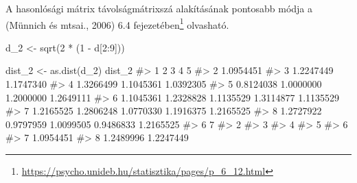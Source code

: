 \documentclass[
  letterpaper,
]{krantz}
\makeatletter
\newenvironment{Shaded}{\begin{snugshade}}{\end{snugshade}}
\newcommand{\AttributeTok}[1]{\textcolor[rgb]{0.40,0.45,0.13}{#1}}
\newcommand{\CommentTok}[1]{\textcolor[rgb]{0.37,0.37,0.37}{#1}}
\newcommand{\DecValTok}[1]{\textcolor[rgb]{0.68,0.00,0.00}{#1}}
\newcommand{\FunctionTok}[1]{\textcolor[rgb]{0.28,0.35,0.67}{#1}}
\newcommand{\NormalTok}[1]{\textcolor[rgb]{0.00,0.23,0.31}{#1}}
\newcommand{\OtherTok}[1]{\textcolor[rgb]{0.00,0.23,0.31}{#1}}
\newcommand{\SpecialCharTok}[1]{\textcolor[rgb]{0.37,0.37,0.37}{#1}}
\renewcommand{\href}[2]{#2\footnote{\url{#1}}}
\newenvironment{kframe}{%
\medskip{}
\setlength{\fboxsep}{.8em}
 \def\at@end@of@kframe{}%
 \ifinner\ifhmode%
  \def\at@end@of@kframe{\end{minipage}}%
  \begin{minipage}{\columnwidth}%
 \fi\fi%
 \def\FrameCommand##1{\hskip\@totalleftmargin \hskip-\fboxsep
 \colorbox{shadecolor}{##1}\hskip-\fboxsep
     \hskip-\linewidth \hskip-\@totalleftmargin \hskip\columnwidth}%
 \MakeFramed {\advance\hsize-\width
   \@totalleftmargin\z@ \linewidth\hsize
   \@setminipage}}%
 {\par\unskip\endMakeFramed%
 \at@end@of@kframe}
\renewenvironment{Shaded}{\begin{kframe}}{\end{kframe}}
\makeatother
\begin{document}
\begin{Shaded}
\end{Shaded}

A hasonlósági mátrix távolságmátrixszá alakításának pontosabb módja a
(Münnich és mtsai., 2006)
\href{https://psycho.unideb.hu/statisztika/pages/p_6_12.html}{6.4
fejezetében} olvasható.

\begin{Shaded}
\begin{Highlighting}[]
\NormalTok{d\_2 }\OtherTok{\textless{}{-}} \FunctionTok{sqrt}\NormalTok{(}\DecValTok{2} \SpecialCharTok{*}\NormalTok{ (}\DecValTok{1} \SpecialCharTok{{-}}\NormalTok{ d[}\DecValTok{2}\SpecialCharTok{:}\DecValTok{9}\NormalTok{]))}
\end{Highlighting}
\end{Shaded}

\begin{Shaded}
\begin{Highlighting}[]
\NormalTok{dist\_2 }\OtherTok{\textless{}{-}} \FunctionTok{as.dist}\NormalTok{(d\_2)}
\NormalTok{dist\_2}
\CommentTok{\#\textgreater{}           1         2         3         4         5}
\CommentTok{\#\textgreater{} 2 1.0954451                                        }
\CommentTok{\#\textgreater{} 3 1.2247449 1.1747340                              }
\CommentTok{\#\textgreater{} 4 1.3266499 1.1045361 1.0392305                    }
\CommentTok{\#\textgreater{} 5 0.8124038 1.0000000 1.2000000 1.2649111          }
\CommentTok{\#\textgreater{} 6 1.1045361 1.2328828 1.1135529 1.3114877 1.1135529}
\CommentTok{\#\textgreater{} 7 1.2165525 1.2806248 1.0770330 1.1916375 1.2165525}
\CommentTok{\#\textgreater{} 8 1.2727922 0.9797959 1.0099505 0.9486833 1.2165525}
\CommentTok{\#\textgreater{}           6         7}
\CommentTok{\#\textgreater{} 2                    }
\CommentTok{\#\textgreater{} 3                    }
\CommentTok{\#\textgreater{} 4                    }
\CommentTok{\#\textgreater{} 5                    }
\CommentTok{\#\textgreater{} 6                    }
\CommentTok{\#\textgreater{} 7 1.0954451          }
\CommentTok{\#\textgreater{} 8 1.2489996 1.2247449}
\end{Highlighting}
\end{Shaded}
\end{document}
